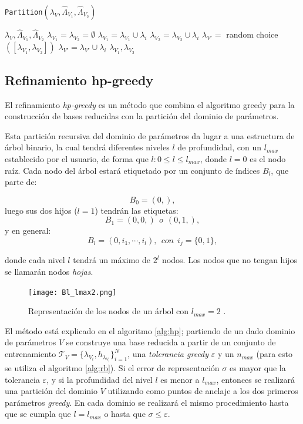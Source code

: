 \begin{algorithm}
\caption{\texttt{Partition}\((\lambda_V, \hat{\Lambda}_{V_1}, \hat{\Lambda}_{V_2})\)}\label{alg:part}
\begin{algorithmic}[1]
\Require $\lambda_V, \hat{\Lambda}_{V_1}, \hat{\Lambda}_{V_2}$ 
\vspace{3mm}
\State $\lambda_{V_1} = \lambda_{V_2} = \emptyset$
		\State $\lambda_{V_1} = \lambda_{V_1} \cup \lambda_i$
		\State $\lambda_{V_2} = \lambda_{V_2} \cup \lambda_i$
	\Else
		\State $\lambda_{V'} = $ random choice$([\lambda_{V_1}, \lambda_{V_2}])$
		\State $\lambda_{V'} = \lambda_{V'} \cup \lambda_i$
	\EndIf
\EndFor
\vspace{3mm}
\Ensure $\lambda_{V_1}, \lambda_{V_2}$
\end{algorithmic}
\end{algorithm}

\subsection{Refinamiento hp-greedy}


El refinamiento \textit{hp-greedy} es un método que combina el algoritmo greedy para la construcción de bases reducidas con la partición del dominio de parámetros. 

Esta partición recursiva del dominio de parámetros da lugar a una estructura de árbol binario, la cual tendrá diferentes niveles $l$ de profundidad, con un $l_{max}$ establecido por el usuario, de forma que $l : 0 \le l \le l_{max}$, donde $l =0$ es el nodo raíz. Cada nodo del árbol estará etiquetado por un conjunto de índices $B_l$, que parte de:

\[
B_0 = (0,),
\]
luego sus dos hijos ($l=1$) tendrán las etiquetas:
\[
B_1 = (0,0,) \ \ o \ \  (0, 1, ),
\]
y en general:
\[
B_l = (0, i_1, \cdots, i_l), \ \  con \ \ i_j = \{0, 1\},
\]

\noindent donde cada nivel $l$ tendrá un máximo de $2^l$ nodos.
Los nodos que no tengan hijos se llamarán nodos \textit{hojas}.
\begin{figure}[h!]
\centering
\texttt{[image: Bl\_lmax2.png]}
\caption{Representación de los nodos de un árbol con $l_{max}=2$ \cite{Cerino:2022dhr}.}
\end{figure}

El método está explicado en el algoritmo \ref{alg:hp}; partiendo de un dado dominio de parámetros $V$ se construye una base reducida a partir de un conjunto de entrenamiento $\mathcal{T}_V = \{\lambda_{V_i}, h_{\lambda_{V_i}}\}_{i=1}^{N}$, una \textit{tolerancia greedy} $\varepsilon$ y un $n_{max}$ (para esto se utiliza el algoritmo \ref{alg:rb}). Si el error de representación $\sigma$ es mayor que la tolerancia $\varepsilon$, y si la profundidad del nivel $l$ es menor a $l_{max}$, entonces se realizará una partición del dominio $V$ utilizando como puntos de anclaje a los dos primeros parámetros \textit{greedy}. En cada dominio se realizará el mismo procedimiento hasta que se cumpla que $l = l_{max}$ o hasta que $\sigma \le \varepsilon$.

